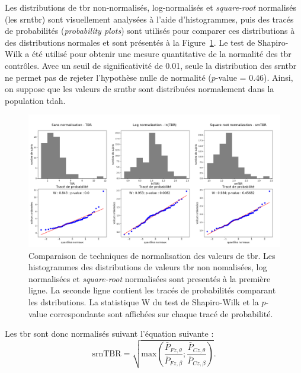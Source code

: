 Les distributions de \gls{tbr} non-normalisés, log-normalisés et \textit{square-root} normalisés (les \gls{srntbr}) sont visuellement analysées à l'aide 
d'histogrammes, puis des tracés de probabilités (\textit{probability plots}) sont utilisés pour comparer ces distributions à des distributions normales 
et sont présentés à la Figure~\ref{Figure:tbr_normalization}. Le test de Shapiro-Wilk \citep{Shapiro1965} a été utilisé pour obtenir une mesure quantitative 
de la normalité des \gls{tbr} contrôles. Avec un seuil de significativité de 0.01, seule la distribution des \gls{srntbr} ne permet pas de rejeter l'hypothèse
nulle de normalité ($p$-value = 0.46). Ainsi, on suppose que les valeurs de \gls{srntbr} sont distribuées normalement dans la population \gls{tdah}. 

\begin{figure}[h!]
  \centering
	\includegraphics[width=1.0\linewidth]{figures/chapter-4/tbr-normalization} 
  \caption{Comparaison de techniques de normalisation des valeurs de \gls{tbr}. Les histogrammes des distributions de valeurs \gls{tbr} non nomalisées,
	log normalisées et \textit{square-root} normalisées sont presentés à la première ligne. La seconde ligne contient les tracés de probabilités comparant les
	dstributions. La statistique W du test de Shapiro-Wilk et la $p$-value correspondante sont affichées sur chaque tracé de probabilité.}
  \label{Figure:tbr_normalization}
\end{figure}

Les \gls{tbr} sont donc normalisés suivant l'équation suivante :
\begin{equation}
\label{eq:tbr_srntbr_computation}
\text{srnTBR} = \sqrt{ \text{max}(\frac{\bar{P}_{Fz,\theta}}{\bar{P}_{Fz,\beta} } ; \frac{\bar{P}_{Cz,\theta}}{\bar{P}_{Cz,\beta}} ) }.
\end{equation}

